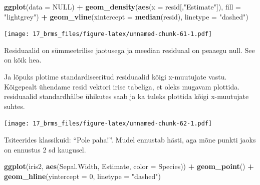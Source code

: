\documentclass[]{book}
\newenvironment{Shaded}{\begin{snugshade}}{\end{snugshade}}
\newcommand{\KeywordTok}[1]{\textcolor[rgb]{0.13,0.29,0.53}{\textbf{#1}}}
\newcommand{\DataTypeTok}[1]{\textcolor[rgb]{0.13,0.29,0.53}{#1}}
\newcommand{\DecValTok}[1]{\textcolor[rgb]{0.00,0.00,0.81}{#1}}
\newcommand{\StringTok}[1]{\textcolor[rgb]{0.31,0.60,0.02}{#1}}
\newcommand{\OtherTok}[1]{\textcolor[rgb]{0.56,0.35,0.01}{#1}}
\newcommand{\OperatorTok}[1]{\textcolor[rgb]{0.81,0.36,0.00}{\textbf{#1}}}
\newcommand{\NormalTok}[1]{#1}
\begin{document}
\begin{Shaded}
\begin{Highlighting}[]
\KeywordTok{ggplot}\NormalTok{(}\DataTypeTok{data =} \OtherTok{NULL}\NormalTok{) }\OperatorTok{+}\StringTok{ }
\StringTok{  }\KeywordTok{geom_density}\NormalTok{(}\KeywordTok{aes}\NormalTok{(}\DataTypeTok{x =}\NormalTok{ resid[,}\StringTok{"Estimate"}\NormalTok{]), }\DataTypeTok{fill =} \StringTok{"lightgrey"}\NormalTok{) }\OperatorTok{+}\StringTok{ }
\StringTok{  }\KeywordTok{geom_vline}\NormalTok{(}\DataTypeTok{xintercept =} \KeywordTok{median}\NormalTok{(resid), }\DataTypeTok{linetype =} \StringTok{"dashed"}\NormalTok{)}
\end{Highlighting}
\end{Shaded}

\texttt{[image: 17\_brms\_files/figure-latex/unnamed-chunk-61-1.pdf]}

Residuaalid on sümmeetrilise jaotusega ja meedian residuaal on peaaegu
null. See on kõik hea.

Ja lõpuks plotime standardiseeritud residuaalid kõigi x-muutujate vastu.
Kõigepealt ühendame resid vektori irise tabeliga, et oleks mugavam
plottida. residuaalid standardhälbe ühikutes saab ja ka tuleks plottida
kõigi x-muutujate suhtes.

\begin{Shaded}
\end{Shaded}

\texttt{[image: 17\_brms\_files/figure-latex/unnamed-chunk-62-1.pdf]}

Tsiteerides klassikuid: ``Pole paha!''. Mudel ennustab hästi, aga mõne
punkti jaoks on ennustus 2 sd kaugusel.

\begin{Shaded}
\begin{Highlighting}[]
\KeywordTok{ggplot}\NormalTok{(iris2, }\KeywordTok{aes}\NormalTok{(Sepal.Width, Estimate, }\DataTypeTok{color =}\NormalTok{ Species)) }\OperatorTok{+}\StringTok{ }
\StringTok{  }\KeywordTok{geom_point}\NormalTok{() }\OperatorTok{+}
\StringTok{  }\KeywordTok{geom_hline}\NormalTok{(}\DataTypeTok{yintercept =} \DecValTok{0}\NormalTok{, }\DataTypeTok{linetype =} \StringTok{"dashed"}\NormalTok{)}
\end{Highlighting}
\end{Shaded}
\end{document}
